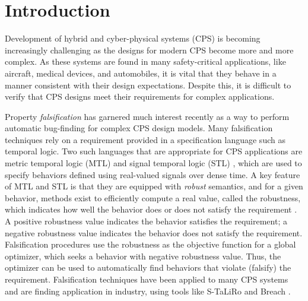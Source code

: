 \section{Introduction} \label{sec:introduction}

Development of hybrid and cyber-physical systems (CPS) is becoming
increasingly challenging as the designs for modern CPS become more and
more complex.  As these systems are found in many safety-critical
applications, like aircraft, medical devices, and automobiles, it is
vital that they behave in a manner consistent with their
design expectations. Despite this, it is difficult to verify that CPS
designs meet their requirements for complex applications.


Property \emph{falsification} has garnered much interest recently as a
way to perform automatic bug-finding for complex CPS design
models. Many falsification techniques rely on a requirement
provided in a specification language such as temporal logic.
Two such
languages that are appropriate for CPS applications are metric
temporal logic (MTL) and signal temporal logic (STL)
\cite{Koymans1990,MalerN04}, which are used to specify behaviors defined
using real-valued signals over dense time. A key feature of MTL and
STL is that they are equipped with \emph{robust} semantics, and for a given behavior, methods exist to efficiently compute a
real value, called the robustness, which indicates how well the
behavior does or does not satisfy the requirement
\cite{FainekosP06fates,DonzeM10}. A positive robustness value
indicates the behavior satisfies the requirement; a negative
robustness value indicates the behavior does not satisfy the
requirement. Falsification procedures use the robustness as the objective function
for a global optimizer, which seeks a
behavior with negative robustness value. Thus, the optimizer can
be used to automatically find behaviors that violate (falsify) the
requirement. Falsification techniques have been applied to many CPS
systems and are finding application in industry, using tools like
S-TaLiRo and Breach \cite{TaliroLFS11,BreachCAV10}.

